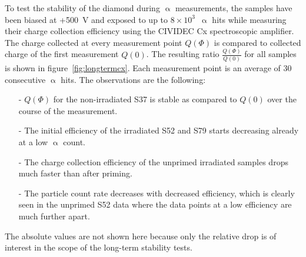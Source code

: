 
To test the stability of the diamond during $\upalpha$ measurements, the samples have been biased at +500~V and exposed to up to $8\times10^3$~$\upalpha$ hits while measuring their charge collection efficiency using the CIVIDEC Cx spectroscopic amplifier. The charge collected at every measurement point $Q(\Phi)$ is compared to collected charge of the first measurement $Q(0)$. The resulting ratio $\frac{Q(\Phi)}{Q(0)}$ for all samples is shown in figure~\ref{fig:longtermcx}. Each measurement point is an average of 30 consecutive $\upalpha$ hits. The observations are the following:
\begin{itemize}
\item[-] $Q(\Phi)$ for the non-irradiated S37 is stable as compared to $Q(0)$ over the course of the measurement.
\item[-] The initial efficiency of the irradiated S52 and S79 starts decreasing already at a low $\upalpha$ count.
\item[-] The charge collection efficiency of the unprimed irradiated samples drops much faster than after priming.
\item[-] The particle count rate decreases with decreased efficiency, which is clearly seen in the unprimed S52 data where the data points at a low efficiency are much further apart.
\end{itemize}
The absolute values are not shown here because only the relative drop is of interest in the scope of the long-term stability tests.

